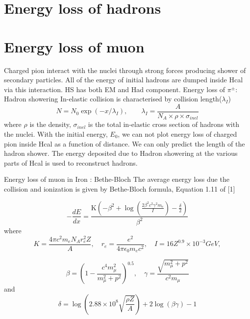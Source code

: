 \section{Energy loss of hadrons}
\section{Energy loss of muon}

Charged pion interact with the nuclei through strong forces producing shower of secondary particles.
All of the energy of initial hadrons are dumped inside Hcal via this interaction. HS has both EM and Had component.
Energy loss of $\pi^\pm :$ Hadron showering
In-elastic collision is characterised by collision length($\lambda_I$)
\begin{equation}
N = N_0 \exp(-x/\lambda_I), \qquad \lambda_I = \frac{A}{N_A\times \rho\times\sigma_{inel}}
\end{equation}
where $\rho$ is the density, $\sigma_{inel}$ is the total in-elastic cross section of hadrons with the nuclei.
With the initial energy, $E_0$, we can not plot energy loss of charged pion inside Hcal as a function of distance. We can only predict the length of the hadron shower.
The energy deposited due to Hadron showering at the various parts of Hcal is used to reconstruct hadrons.


Energy loss of muon in Iron :  Bethe-Bloch
The average energy loss due the collision and ionization is given by Bethe-Bloch formula, Equation 1.11 of [1]

\begin{equation}
-\frac{dE}{dx} =  \frac{\text{K} \left(-\beta ^2+\log \left(\frac{2 \beta ^2 c^2 \gamma ^2
 m_e}{I}\right)-\frac{\delta }{2}\right)}{\beta ^2}
 \label{eq:bethe}
\end{equation}
where
\begin{equation}
K = \frac{4 \pi  c^2 m_e N_A r_e^2 Z}{A}, \quad r_e = \frac{e^2}{4\pi \epsilon_0 m_e c^2}, \quad I = 16Z^{0.9}\times  10^{-3} GeV,
\end{equation}

\begin{equation}
\beta = \left(1-\frac{c^4 m_\mu^2}{m_\mu^2+p^2}\right)^{0.5}, \quad \gamma = \frac{\sqrt{m^2_\mu+p^2}}{c^2 m_\mu}
\end{equation}
and
\begin{equation}
\delta = \log
   \left(2.88\times 10^8
   \sqrt{\frac{\rho  Z}{A}}\right)+2
   \log (\beta  \gamma )-1
\end{equation}

